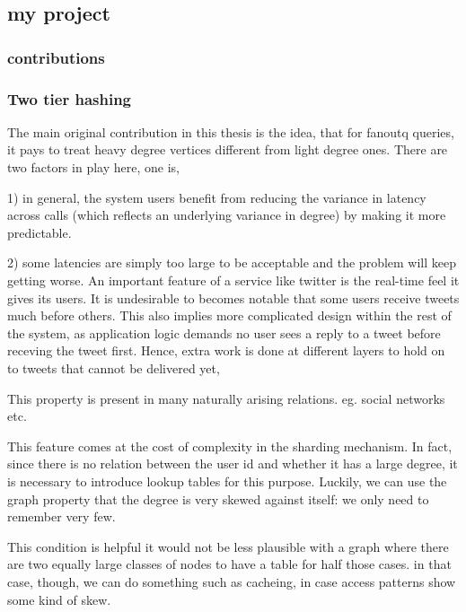 \documentclass[11pt]{article}
\begin{document}

\subsection{my project}

\subsubsection{contributions}

\subsubsection{Two tier hashing}
The main original contribution in this thesis is the idea, that for fanoutq queries, it pays to treat heavy degree vertices different from light degree ones.  There are two factors in play here, one is,  

1) in general, the system users benefit from reducing the variance in latency across calls (which reflects an underlying variance in degree) by making it more predictable. 

2) some latencies are simply too large to be acceptable %
and the problem will keep getting worse.  An important feature of a service like twitter is the real-time feel it gives its users. It is undesirable to  becomes notable that some users receive tweets much before others. This also implies more complicated design within the rest of the system, as application logic demands no user sees a reply to a tweet before receving the tweet first.  Hence, extra work is done at different layers to hold on to tweets that cannot be delivered yet, 

This property is present in many naturally arising relations. eg. social networks etc.

This feature comes at the cost of complexity in the sharding mechanism. In fact, since there is no relation between the user id and whether it has a large degree, it is necessary to introduce lookup tables for this purpose. Luckily, we can use the graph property that  the degree is very skewed against itself: we only need to remember very few. 


This condition is helpful it would not be less plausible with a graph where there are two equally large classes of nodes to have a table for half those cases. in that case, though, we can do something such as cacheing, in case access patterns show some kind of skew. %
\end{document}
